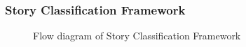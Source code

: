 \documentclass{beamer}
\begin{document}
\begin{frame}
\frametitle{Story Classification Framework}
\begin{figure} 
\centering
{}
\centering
\caption{Flow diagram of Story Classification Framework}
\label{system}
\end{figure}
\end{frame}
\end{document}

